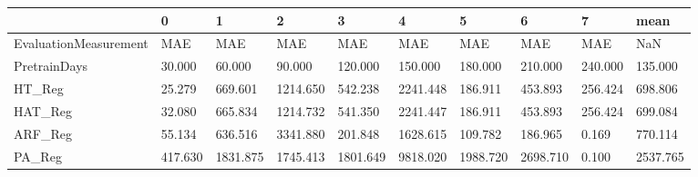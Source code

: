 \begin{tabular}{llllllllll}
\toprule
{} &       0 &        1 &        2 &        3 &        4 &        5 &        6 &       7 &     mean \\
\midrule
EvaluationMeasurement &     MAE &      MAE &      MAE &      MAE &      MAE &      MAE &      MAE &     MAE &      NaN \\
PretrainDays          &  30.000 &   60.000 &   90.000 &  120.000 &  150.000 &  180.000 &  210.000 & 240.000 &  135.000 \\
HT\_Reg                &  25.279 &  669.601 & 1214.650 &  542.238 & 2241.448 &  186.911 &  453.893 & 256.424 &  698.806 \\
HAT\_Reg               &  32.080 &  665.834 & 1214.732 &  541.350 & 2241.447 &  186.911 &  453.893 & 256.424 &  699.084 \\
ARF\_Reg               &  55.134 &  636.516 & 3341.880 &  201.848 & 1628.615 &  109.782 &  186.965 &   0.169 &  770.114 \\
PA\_Reg                & 417.630 & 1831.875 & 1745.413 & 1801.649 & 9818.020 & 1988.720 & 2698.710 &   0.100 & 2537.765 \\
\bottomrule
\end{tabular}
